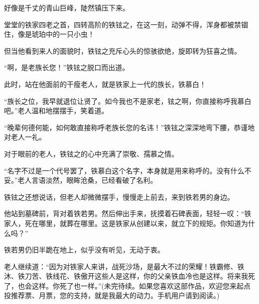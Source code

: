 \begin{this_body}
好像是千丈的青山巨峰，陡然镇压下来。

堂堂的铁家四老之首，四转高阶的铁铉之，在这一刻，动弹不得，浑身都被禁锢住，像是琥珀中的一只小虫！

但当他看到来人的面貌时，铁铉之充斥心头的惊骇欲绝，旋即转为狂喜之情。

“啊，是老族长您！”铁铉之脱口而出道。

此时，站在他面前的干瘦老人，就是铁家上一代的族长，铁慕白！

“族长之位，我早就退位让贤了。如今我也不是家老，铉之啊，你直接称呼我慕白吧。”老人温和地摆摆手，笑着道。

“晚辈何德何能，如何敢直接称呼老族长您的名讳！”铁铉之深深地弯下腰，恭谨地对老人一礼。

对于眼前的老人，铁铉之的心中充满了崇敬、孺慕之情。

“名字不过是一个代号罢了，铁慕白这个名字，本身就是用来称呼的。没有什么不妥。”老人言语淡然，眼眸沧桑，已经看破了名利。

铁铉之还想说话，但老人却微微摆手，慢慢走上前去，来到铁若男的身边。

他站到墓碑前，背对着铁若男。然后伸出手来，抚摸着石碑表面，轻轻一叹：“铁家人，死在哪里，就葬在哪里。这是铁家从创建以来，就立下的规矩。你知道为什么吗？”

铁若男仍旧半跪在地上，似乎没有听见，无动于衷。

老人继续道：“因为对铁家人来讲，战死沙场，是最大不过的荣耀！铁霸修、铁沐、铁刀苦、铁线花、铁傲开这些人是这样，你的父亲铁血冷也是这样。将来我死了，也会这样。你死了也一样。”(未完待续。如果您喜欢这部作品，欢迎您来起点投推荐票、月票，您的支持，就是我最大的动力。手机用户请到阅读。)

\end{this_body}

